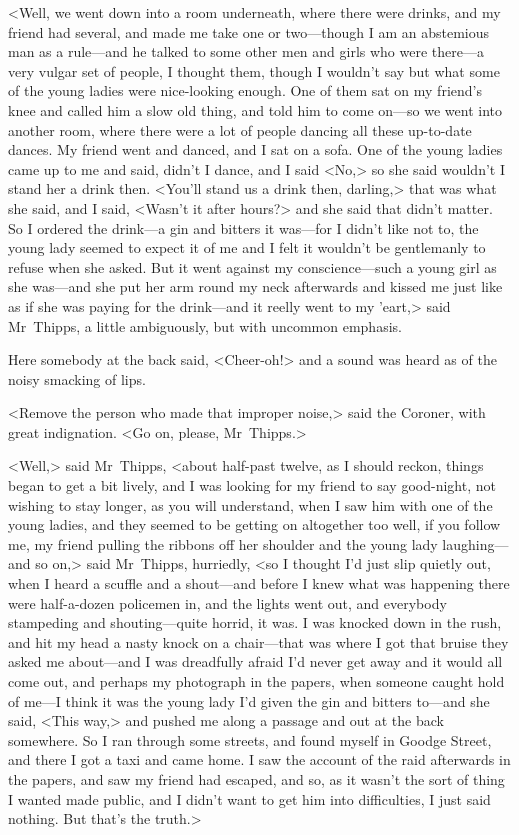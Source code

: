 <Well, we went down into a room underneath, where there were drinks, and my friend had several, and made me take one or two—though I am an abstemious man as a rule—and he talked to some other men and girls who were there—a very vulgar set of people, I thought them, though I wouldn't say but what some of the young ladies were nice-looking enough. One of them sat on my friend's knee and called him a slow old thing, and told him to come on—so we went into another room, where there were a lot of people dancing all these up-to-date dances. My friend went and danced, and I sat on a sofa. One of the young ladies came up to me and said, didn't I dance, and I said <No,> so she said wouldn't I stand her a drink then. <You'll stand us a drink then, darling,> that was what she said, and I said, <Wasn't it after hours?> and she said that didn't matter. So I ordered the drink—a gin and bitters it was—for I didn't like not to, the young lady seemed to expect it of me and I felt it wouldn't be gentlemanly to refuse when she asked. But it went against my conscience—such a young girl as she was—and she put her arm round my neck afterwards and kissed me just like as if she was paying for the drink—and it reelly went to my 'eart,> said Mr~Thipps, a little ambiguously, but with uncommon emphasis.

Here somebody at the back said, <Cheer-oh!> and a sound was heard as of the noisy smacking of lips.

<Remove the person who made that improper noise,> said the Coroner, with great indignation. <Go on, please, Mr~Thipps.>

<Well,> said Mr~Thipps, <about half-past twelve, as I should reckon, things began to get a bit lively, and I was looking for my friend to say good-night, not wishing to stay longer, as you will understand, when I saw him with one of the young ladies, and they seemed to be getting on altogether too well, if you follow me, my friend pulling the ribbons off her shoulder and the young lady laughing—and so on,> said Mr~Thipps, hurriedly, <so I thought I'd just slip quietly out, when I heard a scuffle and a shout—and before I knew what was happening there were half-a-dozen policemen in, and the lights went out, and everybody stampeding and shouting—quite horrid, it was. I was knocked down in the rush, and hit my head a nasty knock on a chair—that was where I got that bruise they asked me about—and I was dreadfully afraid I'd never get away and it would all come out, and perhaps my photograph in the papers, when someone caught hold of me—I think it was the young lady I'd given the gin and bitters to—and she said, <This way,> and pushed me along a passage and out at the back somewhere. So I ran through some streets, and found myself in Goodge Street, and there I got a taxi and came home. I saw the account of the raid afterwards in the papers, and saw my friend had escaped, and so, as it wasn't the sort of thing I wanted made public, and I didn't want to get him into difficulties, I just said nothing. But that's the truth.>

